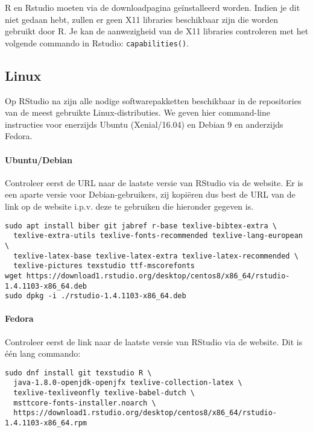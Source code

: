 R en Rstudio moeten via de downloadpagina geïnstalleerd worden. Indien je dit niet gedaan hebt, zullen er geen X11 libraries beschikbaar zijn die worden gebruikt door R. Je kan de aanwezigheid van de X11 libraries controleren met het volgende commando in Rstudio: \texttt{capabilities()}.

\subsection{Linux}
\label{ssec:installatie-linux}

Op RStudio na zijn alle nodige softwarepakketten beschikbaar in de repositories van de meest gebruikte Linux-distributies. We geven hier command-line instructies voor enerzijds Ubuntu (Xenial/16.04) en Debian 9 en anderzijds Fedora.

\paragraph{Ubuntu/Debian} 

Controleer eerst de URL naar de laatste versie van RStudio via de website. Er is een aparte versie voor Debian-gebruikers, zij kopi\"eren dus best de URL van de link op de website i.p.v. deze te gebruiken die hieronder gegeven is.

\begin{verbatim}
sudo apt install biber git jabref r-base texlive-bibtex-extra \
  texlive-extra-utils texlive-fonts-recommended texlive-lang-european \
  texlive-latex-base texlive-latex-extra texlive-latex-recommended \
  texlive-pictures texstudio ttf-mscorefonts
wget https://download1.rstudio.org/desktop/centos8/x86_64/rstudio-1.4.1103-x86_64.deb
sudo dpkg -i ./rstudio-1.4.1103-x86_64.deb
\end{verbatim}

\paragraph{Fedora}

Controleer eerst de link naar de laatste versie van RStudio via de website. Dit is één lang commando:

\begin{verbatim}
sudo dnf install git texstudio R \
  java-1.8.0-openjdk-openjfx texlive-collection-latex \
  texlive-texliveonfly texlive-babel-dutch \
  msttcore-fonts-installer.noarch \
  https://download1.rstudio.org/desktop/centos8/x86_64/rstudio-1.4.1103-x86_64.rpm
\end{verbatim}

